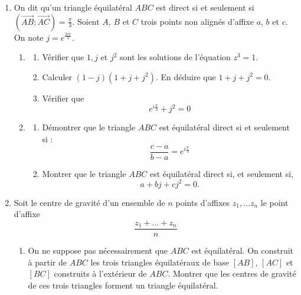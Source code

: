 \documentclass[a4paper,12pt]{article}
\title{
\centering
\tcbset{colframe=BlackSav,colback=GrayBG}
\tcbox[tikznode]{
Chapitre 3 \\ Devoir maison 1
}
}
\author{}
\date{}
\begin{document}
\maketitle

\begin{exercice}[title={Exercice 18 - {[}Représenter, Calculer, Raisonner{]}}]{}{}
\begin{enumerate}
    \item On dit qu'un triangle équilatéral $ABC$ est direct si et seulement si $(\overrightarrow{AB}; \overrightarrow{AC}) = \frac{\pi}{3}$.
    Soient \( A \), \( B \) et \( C \) trois points non alignés d’affixe \( a \), \( b \) et \( c \). On note \( j = e^{\frac{2i\pi}{3}} \).
    \begin{enumerate}
        \item \begin{enumerate}
            \item Vérifier que $1, j$ et $j^2$ sont les solutions de l'équation $z^3 = 1$.
            \item Calculer $(1-j)(1 + j + j^2)$. En déduire que $1 + j + j^2 = 0$.
            \item Vérifier que
            $$e^{i\frac{\pi}{3}} + j^2 = 0$$
        \end{enumerate}
        \item \begin{enumerate}
            \item Démontrer que le triangle $ABC$ est équilatéral direct si et seulement si :
            $$\frac{c - a}{b - a} = e^{i\frac{\pi}{3}}$$
            \item Montrer que le triangle \( ABC \) est équilatéral direct si, et seulement si,
            \[
            a + bj + cj^2 = 0.
            \]
        \end{enumerate}
    \end{enumerate}
    \item Soit le centre de gravité d'un ensemble de $n$ points d'affixes $z_1, \dots z_n$ le point d'affixe
    $$\dfrac{z_1 + \dots + z_n}{n}$$ 
    \begin{enumerate}
        \item On ne suppose pas nécessairement que \( ABC \) est équilatéral. On construit à partir de \( ABC \) les trois triangles équilatéraux de base \([AB]\), \([AC]\) et \([BC]\) construits à l’extérieur de \( ABC \). Montrer que les centres de gravité de ces trois triangles forment un triangle équilatéral.
    \end{enumerate}
\end{enumerate}
\end{exercice}
\end{document}
